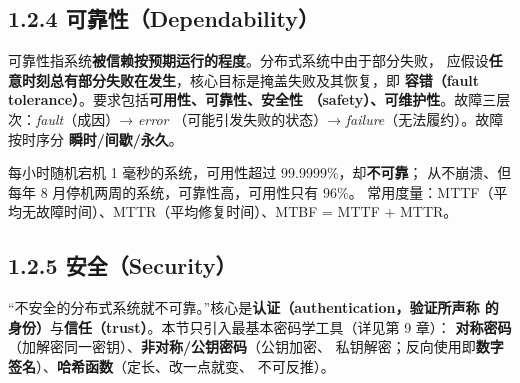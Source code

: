 \begin{closeread}
\end{closeread}


\subsection*{1.2.4 可靠性（Dependability）}
可靠性指系统\textbf{被信赖按预期运行的程度}。分布式系统中由于部分失败，
应假设\textbf{任意时刻总有部分失败在发生}，核心目标是掩盖失败及其恢复，即
\textbf{容错（fault tolerance）}。要求包括\textbf{可用性、可靠性、安全性
（safety）、可维护性}。故障三层次：\emph{fault}（成因）→ \emph{error}
（可能引发失败的状态）→ \emph{failure}（无法履约）。故障按时序分
\textbf{瞬时/间歇/永久}。

\begin{closeread}
\end{closeread}


\begin{ideabox}
每小时随机宕机 1 毫秒的系统，可用性超过 99.9999\%，却\textbf{不可靠}；
从不崩溃、但每年 8 月停机两周的系统，可靠性高，可用性只有 96\%。
常用度量：MTTF（平均无故障时间）、MTTR（平均修复时间）、MTBF = MTTF + MTTR。
\end{ideabox}

\subsection*{1.2.5 安全（Security）}
“不安全的分布式系统就不可靠。”核心是\textbf{认证（authentication，验证所声称
的身份）}与\textbf{信任（trust）}。本节只引入最基本密码学工具（详见第 9 章）：
\textbf{对称密码}（加解密同一密钥）、\textbf{非对称/公钥密码}（公钥加密、
私钥解密；反向使用即\textbf{数字签名}）、\textbf{哈希函数}（定长、改一点就变、
不可反推）。

